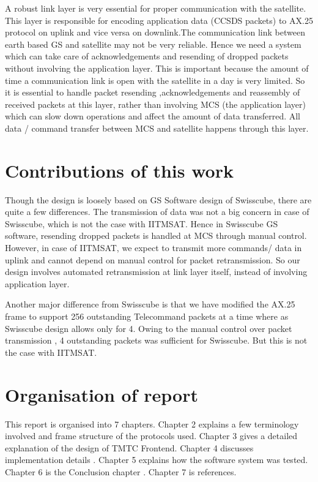 \documentclass[BTech]{iitmdiss}
\begin{document}
A robust link layer is very essential for proper communication with the satellite. This layer is responsible for encoding application data (CCSDS packets) to AX.25 protocol on uplink and vice versa on downlink.The communication link between earth based GS and satellite may not be very reliable. Hence we need a system which can take care of acknowledgements and resending of dropped packets without involving the application layer. This is important because the amount of time a communication link is open with the satellite in a day is very limited. So it is essential to handle packet resending ,acknowledgements and reassembly of received packets at this layer, rather than involving MCS (the application layer) which can slow down operations and affect the amount of data transferred. All data / command transfer between MCS and satellite happens through this layer.

\section{Contributions of this work}
Though the design is loosely based on GS Software design of Swisscube, there are quite a few differences. The transmission of data was not a big concern in case of Swisscube, which is not the case with IITMSAT. Hence in Swisscube GS software, resending dropped packets is handled at MCS through manual control. However, in case of IITMSAT, we expect to transmit more commands/ data in uplink and cannot depend on manual control for packet retransmission. So our design involves automated retransmission at link layer itself, instead of involving application layer. 
\par Another major difference from Swisscube is that we have modified the AX.25 frame to support 256 outstanding Telecommand packets at a time where as Swisscube design allows only for 4. Owing to the manual control over packet transmission , 4 outstanding packets was sufficient for Swisscube. But this is not the case with IITMSAT. 
 
 \section{Organisation of report}
 
This report is organised into 7 chapters. Chapter 2 explains a few terminology involved and frame structure of the protocols used. Chapter 3 gives a detailed explanation of the design of TMTC Frontend. Chapter 4 discusses  implementation details . Chapter 5 explains how the software system was tested. Chapter 6 is the Conclusion chapter . Chapter 7 is references. 
\end{document}
